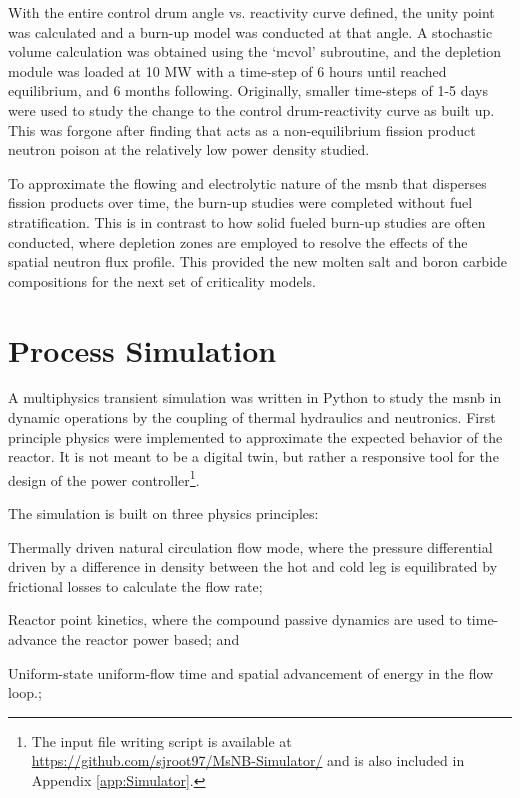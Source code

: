  With the entire control drum angle vs. reactivity curve defined, the unity point was calculated and a burn-up model was conducted at that angle. A stochastic volume calculation was obtained using the `mcvol' subroutine, and the depletion module was loaded at 10 MW with a time-step of 6 hours until \Xe reached equilibrium, and 6 months following. Originally, smaller time-steps of 1-5 days were used to study the change to the control drum-reactivity curve as \Sm built up. This was forgone after finding that \Sm acts as a non-equilibrium fission product neutron poison at the relatively low power density studied. 
 
 To approximate the flowing and electrolytic nature of the \acs{msnb} that disperses fission products over time, the burn-up studies were completed without fuel stratification. This is in contrast to how solid fueled burn-up studies are often conducted, where depletion zones are employed to resolve the effects of the spatial neutron flux profile. This provided the new molten salt and boron carbide compositions for the next set of criticality models.

\section{Process Simulation}\label{Section:Python}
A multiphysics transient simulation was written in Python to study the \acs{msnb} in dynamic operations by the coupling of thermal hydraulics and neutronics. First principle physics were implemented to approximate the expected behavior of the reactor. It is not meant to be a digital twin, but rather a responsive tool for the design of the power controller\footnote{The input file writing script is available at \href{https://github.com/sjroot97/MsNB-Simulator/}{https://github.com/sjroot97/MsNB-Simulator/} and is also included in Appendix \ref{app:Simulator}.}.

The simulation is built on three physics principles: 
\begin{enumerate*}
    \item Thermally driven natural circulation flow mode, where the pressure differential driven by a difference in density between the hot and cold leg is equilibrated by frictional losses to calculate the flow rate;
    \item Reactor point kinetics, where the compound passive dynamics are used to time-advance the reactor power based; and
    \item Uniform-state uniform-flow time and spatial advancement of energy in the flow loop.;
\end{enumerate*}

